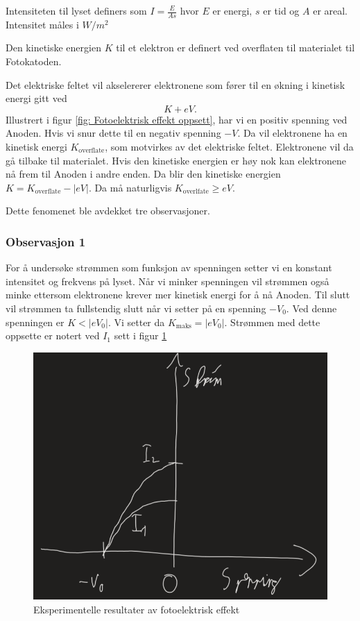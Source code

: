 Intensiteten til lyset definers som $I = \frac{E}{As}$ hvor $E$ er energi, $s$ er tid og $A$ er areal. Intensitet måles i $W / m^{2}$

Den kinetiske energien $K$ til et elektron er definert ved overflaten til materialet til Fotokatoden. 

Det elektriske feltet vil akselererer elektronene som fører til en økning i kinetisk energi gitt ved 
\[
K + eV. 
\]
Illustrert i figur \ref{fig: Fotoelektrisk effekt oppsett}, har vi en positiv spenning ved Anoden. Hvis vi snur dette til en negativ spenning $-V$. Da vil elektronene ha en kinetisk energi $K_{\text{overflate}}$, som motvirkes av det elektriske feltet. Elektronene vil da gå tilbake til materialet. Hvis den kinetiske energien er høy nok kan elektronene nå frem til Anoden i andre enden. Da blir den kinetiske energien $K = K_{\text{overflate}} - \left\vert eV \right\vert $. Da må naturligvis $K_{\text{overlfate}} \ge  eV$. 

Dette fenomenet ble avdekket tre observasjoner. 

\subsubsection{Observasjon 1}
For å undersøke strømmen som funksjon av spenningen setter vi en konstant intensitet og frekvens på lyset. Når vi minker spenningen vil strømmen også minke ettersom elektronene krever mer kinetisk energi for å nå Anoden. Til slutt vil strømmen ta fullstendig slutt når vi setter på en spenning $-V_0$. Ved denne spenningen er $K < \left\vert eV_0 \right\vert $. Vi setter da $K_{\text{maks}} = \left\vert eV_0 \right\vert $. Strømmen med dette oppsette er notert ved $I_1$ sett i figur \ref{fig: Fotoelektrisk resultat}

\begin{figure}[h!]
  \centering
  \includegraphics[scale = .4]{Figures/Fotoelektrisk resultat.png}
  \caption{Eksperimentelle resultater av fotoelektrisk effekt}
  \label{fig: Fotoelektrisk resultat}
\end{figure}



